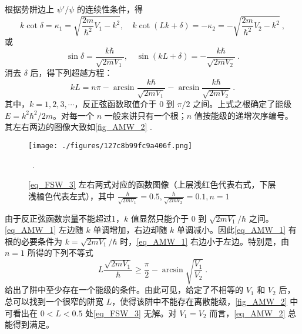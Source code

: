 根据势阱边上 $\psi'/\psi$ 的连续性条件，得
\begin{equation}
k\cot\delta=\kappa_1=\sqrt{\frac{2m}{\hbar^2}V_1-k^2},\quad k\cot(Lk+\delta)=-\kappa_2=-\sqrt{\frac{2m}{\hbar^2}V_2-k^2}~,
\end{equation}
或
\begin{equation}
\sin\delta=\frac{k\hbar}{\sqrt{2mV_1}},\quad\sin(kL+\delta)=-\frac{k\hbar}{\sqrt{2mV_2}}~.
\end{equation}
消去 $\delta$ 后，得下列超越方程：
\begin{equation}\label{eq_AMW_1}
kL=n\pi-\arcsin\frac{k\hbar}{\sqrt{2mV_1}}-\arcsin\frac{k\hbar}{\sqrt{2mV_2}}~.
\end{equation}
其中，$k=1,2,3,\cdots$，反正弦函数取值介于 $0$ 到 $\pi/2$ 之间。上式之根确定了能级 $E=k^2\hbar^2/2m$。对每一个 $n$ 一般来讲只有一个根；$n$ 值按能级的递增次序编号。其左右两边的图像大致如\autoref{fig_AMW_2} .
\begin{figure}[ht]
\centering
\texttt{[image: ./figures/127c8b99fc9a406f.png]}
\caption{\autoref{eq_FSW_3} 左右两式对应的函数图像（上层浅红色代表右式，下层浅橘色代表左式），其中 $\frac{\hbar}{\sqrt{2mV_1}}=0.5,\frac{\hbar}{\sqrt{2mV_2}}=0.1,n=1$} \label{fig_AMW_2}~.
\end{figure}
由于反正弦函数宗量不能超过1，$k$ 值显然只能介于 $0$ 到 $\sqrt{2mV_1}/\hbar$ 之间。\autoref{eq_AMW_1} 左边随 $k$ 单调增加，右边却随 $k$ 单调减小。因此\autoref{eq_AMW_1} 有根的必要条件为 $k=\sqrt{2mV_1}/\hbar$ 时，\autoref{eq_AMW_1} 右边小于左边。特别是，由 $n=1$ 所得的下列不等式
\begin{equation}\label{eq_AMW_2}
L\frac{\sqrt{2mV_1}}{\hbar}\geq\frac{\pi}{2}-\arcsin\sqrt{\frac{V_1}{V_2}}~.
\end{equation}
给出了阱中至少存在一个能级的条件。由此可见，给定了不相等的 $V_1$ 和 $V_2$ 后，总可以找到一个很窄的阱宽 $L$，使得该阱中不能存在离散能级，\autoref{fig_AMW_2} 中可看出在 $0<L<0.5$ 处\autoref{eq_FSW_3} 无解。对 $V_1=V_2$ 而言，\autoref{eq_AMW_2} 总能得到满足。

